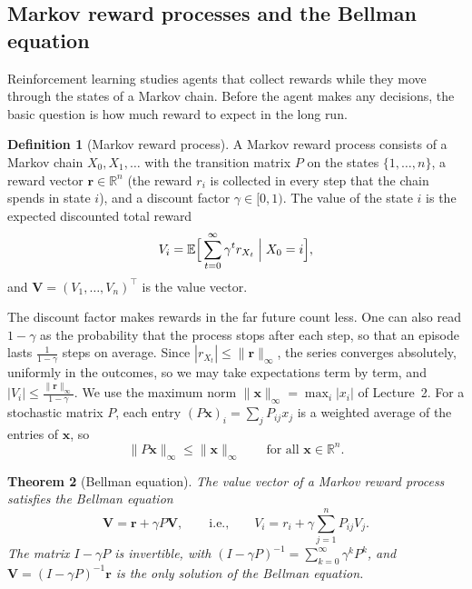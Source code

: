 \documentclass[11pt]{article}
\newcommand{\norm}[1]{\lVert #1 \rVert}
\newcommand{\E}{\mathbb{E}}
\theoremstyle{definition}
\newtheorem{definition}{Definition}[section]
\theoremstyle{plain}
\newtheorem{theorem}[definition]{Theorem}
\theoremstyle{remark}
\begin{document}
\subsection{Markov reward processes and the Bellman equation}\label{sec:bellman}

Reinforcement learning studies agents that collect rewards while they move through the states of a Markov chain. Before the agent makes any decisions, the basic question is how much reward to expect in the long run.

\begin{definition}[Markov reward process]\label{def:mrp}
    A Markov reward process consists of a Markov chain $X_0, X_1, \ldots$ with the transition matrix $P$ on the states $\{1, \ldots, n\}$, a reward vector $\mathbf{r} \in \mathbb{R}^n$ (the reward $r_i$ is collected in every step that the chain spends in state $i$), and a discount factor $\gamma \in [0, 1)$. The value of the state $i$ is the expected discounted total reward
    \[V_i = \E\Big[\sum_{t=0}^\infty \gamma^tr_{X_t} \Bigm| X_0 = i\Big],\]
    and $\mathbf{V} = (V_1, \ldots, V_n)^\top$ is the value vector.
\end{definition}

The discount factor makes rewards in the far future count less. One can also read $1 - \gamma$ as the probability that the process stops after each step, so that an episode lasts $\frac{1}{1 - \gamma}$ steps on average. Since $|r_{X_t}| \leq \norm{\mathbf{r}}_\infty$, the series converges absolutely, uniformly in the outcomes, so we may take expectations term by term, and $|V_i| \leq \frac{\norm{\mathbf{r}}_\infty}{1 - \gamma}$. We use the maximum norm $\norm{\mathbf{x}}_\infty = \max_i |x_i|$ of Lecture~2. For a stochastic matrix $P$, each entry $(P\mathbf{x})_i = \sum_j P_{ij}x_j$ is a weighted average of the entries of $\mathbf{x}$, so
\[\norm{P\mathbf{x}}_\infty \leq \norm{\mathbf{x}}_\infty \qquad \text{for all } \mathbf{x} \in \mathbb{R}^n.\]

\begin{theorem}[Bellman equation]\label{thm:bellman}
    The value vector of a Markov reward process satisfies the Bellman equation
    \[\mathbf{V} = \mathbf{r} + \gamma P\mathbf{V}, \qquad \text{i.e.,} \qquad V_i = r_i + \gamma\sum_{j=1}^n P_{ij}V_j.\]
    The matrix $I - \gamma P$ is invertible, with $(I - \gamma P)^{-1} = \sum_{k=0}^\infty \gamma^kP^k$, and $\mathbf{V} = (I - \gamma P)^{-1}\mathbf{r}$ is the only solution of the Bellman equation.
\end{theorem}
\end{document}
